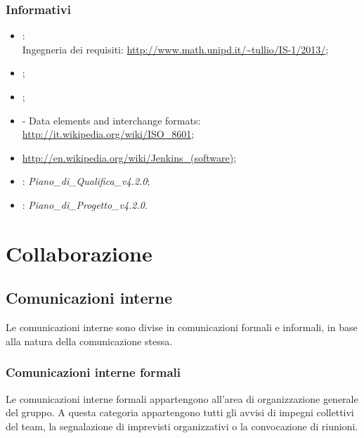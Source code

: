 \subsubsection{Informativi}
\begin{itemize}
\item {}:\\
Ingegneria dei requisiti: \url{http://www.math.unipd.it/~tullio/IS-1/2013/};
\item {};\\
\item {};\\
\item {} - Data elements and interchange formats: \url{http://it.wikipedia.org/wiki/ISO\_8601};
\item {} \url{http://en.wikipedia.org/wiki/Jenkins_(software)};
\item {}: \emph{Piano\_di\_Qualifica\_v4.2.0};
\item {}: \emph{Piano\_di\_Progetto\_v4.2.0}.
\end{itemize}

\newpage
\section{Collaborazione}
\label{3.0}

\subsection{Comunicazioni interne}
\label{3.2}
Le comunicazioni interne sono divise in comunicazioni formali e informali, in base alla natura della comunicazione stessa.

\subsubsection{Comunicazioni interne formali}
Le comunicazioni interne formali appartengono all'area di organizzazione generale del gruppo. A questa categoria appartengono tutti gli avvisi di impegni collettivi del team, la segnalazione di imprevisti organizzativi o la convocazione di riunioni.

